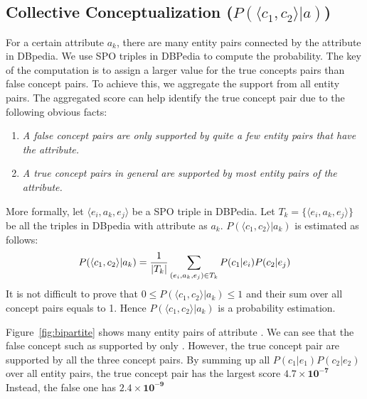 \subsection{Collective Conceptualization ($P( \langle c_{1},c_{2} \rangle |a)$) }
For a certain attribute $a_k$, there are many entity pairs connected by the attribute in DBpedia.
We use SPO triples in DBPedia to compute the probability.
The key of the computation is to assign a larger value for the true concepts pairs than false concept pairs.
To achieve this, we aggregate the support from all entity pairs.
The aggregated score can help identify the true concept pair due to the following
obvious facts:
\begin{enumerate}
\small
\item \emph{A false concept pairs are only supported by quite a few
entity pairs that have the attribute.}
\item \emph{A true concept pairs in general are supported by most entity pairs of the attribute.}
\end{enumerate}

More formally, let $ \langle e_i, a_k, e_j \rangle $ be a SPO triple in DBPedia.
Let $T_k=\{\langle e_i, a_k, e_j \rangle\}$ be all the triples in DBpedia with attribute as $a_k$.
$P( \langle c_1, c_2 \rangle |a_k)$ is estimated as follows:
\begin{equation}
\small
P(\langle c_1, c_2\rangle|a_k)= \frac{1}{|T_k|}\sum_{  (e_{i},a_k,e_{j})\in T_k } P(c_1|e_{i})P(c_2|e_{j})
\label{eq:pccga}
\end{equation}
It is not difficult to prove that $0\leq P( \langle c_1, c_2 \rangle |a_k)\leq 1$ and their sum over all concept pairs equals to 1.
Hence $P( \langle c_1, c_2 \rangle |a_k)$ is a probability estimation.

\begin{example}
\label{exa:pggga}
Figure~\ref{fig:bipartite} shows many entity pairs of attribute . 
We can see that the false concept such as  supported by only .
However, the true concept pair  are supported by all the three concept pairs. 
By summing up all $P(c_1|e_1)P(c_2|e_2) $ over all entity pairs, the true concept pair  has the largest score $\mathbf{4.7\times10^{-7}}$ 
Instead, the false one  has $\mathbf{2.4\times10^{-9}}$
\end{example}


